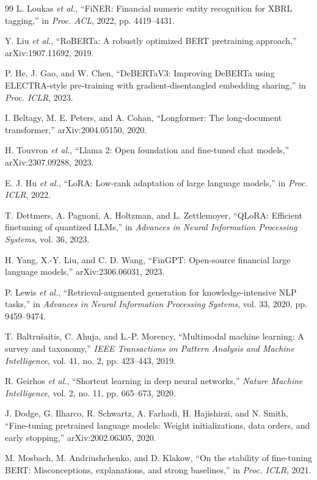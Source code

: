\documentclass[conference]{IEEEtran}
\begin{document}
\begin{thebibliography}{99}
 L. Loukas \emph{et al.}, ``FiNER: Financial numeric entity recognition for XBRL tagging,'' in \emph{Proc. ACL}, 2022, pp. 4419--4431.

 Y. Liu \emph{et al.}, ``RoBERTa: A robustly optimized BERT pretraining approach,'' arXiv:1907.11692, 2019.

 P. He, J. Gao, and W. Chen, ``DeBERTaV3: Improving DeBERTa using ELECTRA-style pre-training with gradient-disentangled embedding sharing,'' in \emph{Proc. ICLR}, 2023.

 I. Beltagy, M. E. Peters, and A. Cohan, ``Longformer: The long-document transformer,'' arXiv:2004.05150, 2020.

 H. Touvron \emph{et al.}, ``Llama 2: Open foundation and fine-tuned chat models,'' arXiv:2307.09288, 2023.

 E. J. Hu \emph{et al.}, ``LoRA: Low-rank adaptation of large language models,'' in \emph{Proc. ICLR}, 2022.

 T. Dettmers, A. Pagnoni, A. Holtzman, and L. Zettlemoyer, ``QLoRA: Efficient finetuning of quantized LLMs,'' in \emph{Advances in Neural Information Processing Systems}, vol. 36, 2023.

 H. Yang, X.-Y. Liu, and C. D. Wang, ``FinGPT: Open-source financial large language models,'' arXiv:2306.06031, 2023.

 P. Lewis \emph{et al.}, ``Retrieval-augmented generation for knowledge-intensive NLP tasks,'' in \emph{Advances in Neural Information Processing Systems}, vol. 33, 2020, pp. 9459--9474.

 T. Baltrušaitis, C. Ahuja, and L.-P. Morency, ``Multimodal machine learning: A survey and taxonomy,'' \emph{IEEE Transactions on Pattern Analysis and Machine Intelligence}, vol. 41, no. 2, pp. 423--443, 2019.

 R. Geirhos \emph{et al.}, ``Shortcut learning in deep neural networks,'' \emph{Nature Machine Intelligence}, vol. 2, no. 11, pp. 665--673, 2020.

 J. Dodge, G. Ilharco, R. Schwartz, A. Farhadi, H. Hajishirzi, and N. Smith, ``Fine-tuning pretrained language models: Weight initializations, data orders, and early stopping,'' arXiv:2002.06305, 2020.

 M. Mosbach, M. Andriushchenko, and D. Klakow, ``On the stability of fine-tuning BERT: Misconceptions, explanations, and strong baselines,'' in \emph{Proc. ICLR}, 2021.


\end{thebibliography}
\end{document}
